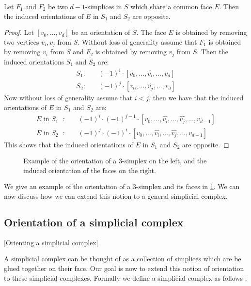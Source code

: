 \begin{claim}
	\label{claim:opposite_orientations}
	Let $F_1$ and $F_2$ be two $d-1$-simplices in $S$ which share a common face $E$. Then the induced orientations of $E$ in $S_1$ and $S_2$ are opposite.
\end{claim}
\begin{proof}
	Let $[v_0, \dots, v_{d}]$ be an orientation of $S$. The face $E$ is obtained by removing two vertices $v_i, v_j$ from $S$. Without loss of generality assume that $F_1$ is obtained by removing $v_i$ from $S$ and $F_2$ is obtained by removing $v_j$ from $S$. Then the induced orientations $S_1$ and $S_2$ are:
	\begin{align*}
		S_1: \quad & (-1)^i \cdot [v_0, \dots, \hat{v_i}, \dots, v_{d}] \\
		S_2: \quad & (-1)^j \cdot [v_0, \dots, \hat{v_j}, \dots, v_{d}]
	\end{align*}
	Now without loss of generality assume that $i < j$, then we have that the induced orientations of $E$ in $S_1$ and $S_2$ are:
	\begin{align*}
		\text{$E$ in $S_1$ }: \quad & (-1)^i \cdot (-1)^{j-1} \cdot [v_0, \dots, \hat{v_i}, \dots, \hat{v_j}, \dots, v_{d-1}] \\
		\text{$E$ in $S_2$ }: \quad & (-1)^j \cdot (-1)^i \cdot [v_0, \dots, \hat{v_i}, \dots, \hat{v_j}, \dots, v_{d-1}]
	\end{align*}
	This shows that the induced orientations of $E$ in $S_1$ and $S_2$ are opposite.
\end{proof}

\begin{figure}[ht]
	\centering
	\caption[Orientation of a simplex]{Example of the orientation of a 3-simplex on the left, and the induced orientation of the faces on the right.}
	\label{fig:orientation_of_simplex}
\end{figure}

We give an example of the orientation of a 3-simplex and its faces in \cref{fig:orientation_of_simplex}. We can now discuss how we can extend this notion to a general simplicial complex.

\subsection{Orientation of a simplicial complex}[Orienting a simplicial complex]

A simplicial complex can be thought of as a collection of simplices which are be glued together on their face. Our goal is now to extend this notion of orientation to these simplicial complexes. Formally we define a simplicial complex as follows :

